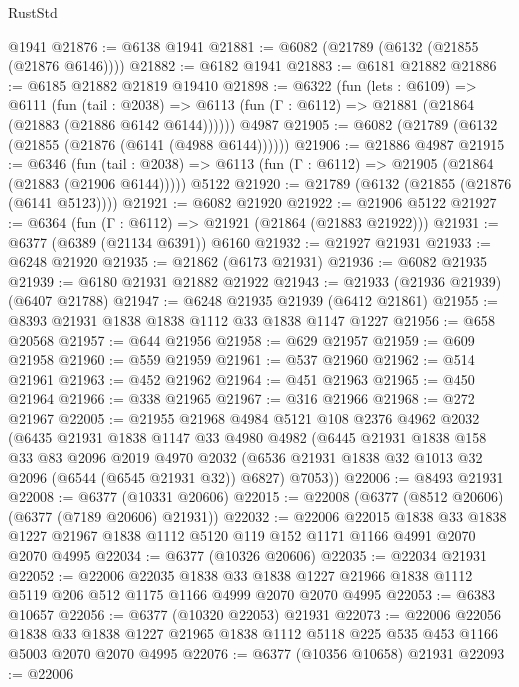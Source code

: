 \begin{lexlean}{RustStd}
\begin{coremodule}
    @1941
@21876 := @6138 @1941
@21881 := @6082 (@21789 (@6132 (@21855 (@21876 @6146))))
@21882 := @6182 @1941
@21883 := @6181 @21882
@21886 := @6185 @21882 @21819 @19410
@21898 := @6322
    (fun (lets : @6109) =>
    @6111
      (fun (tail : @2038) =>
      @6113 (fun (Γ : @6112) => @21881 (@21864 (@21883 (@21886 @6142 @6144))))))
    @4987
@21905 := @6082 (@21789 (@6132 (@21855 (@21876 (@6141 (@4988 @6144))))))
@21906 := @21886 @4987
@21915 := @6346
    (fun (tail : @2038) => @6113 (fun (Γ : @6112) => @21905 (@21864 (@21883 (@21906 @6144)))))
    @5122
@21920 := @21789 (@6132 (@21855 (@21876 (@6141 @5123))))
@21921 := @6082 @21920
@21922 := @21906 @5122
@21927 := @6364 (fun (Γ : @6112) => @21921 (@21864 (@21883 @21922)))
@21931 := @6377 (@6389 (@21134 @6391)) @6160
@21932 := @21927 @21931
@21933 := @6248 @21920
@21935 := @21862 (@6173 @21931)
@21936 := @6082 @21935
@21939 := @6180 @21931 @21882 @21922
@21943 := @21933 (@21936 @21939) (@6407 @21788)
@21947 := @6248 @21935 @21939 (@6412 @21861)
@21955 := @8393 @21931 @1838 @1838 @1112 @33 @1838 @1147 @1227
@21956 := @658 @20568
@21957 := @644 @21956
@21958 := @629 @21957
@21959 := @609 @21958
@21960 := @559 @21959
@21961 := @537 @21960
@21962 := @514 @21961
@21963 := @452 @21962
@21964 := @451 @21963
@21965 := @450 @21964
@21966 := @338 @21965
@21967 := @316 @21966
@21968 := @272 @21967
@22005 := @21955
    @21968
    @4984
    @5121
    @108
    @2376
    @4962
    @2032
    (@6435
      @21931
      @1838
      @1147
      @33
      @4980
      @4982
      (@6445
        @21931
        @1838
        @158
        @33
        @83
        @2096
        @2019
        @4970
        @2032
        (@6536 @21931 @1838 @32 @1013 @32 @2096 (@6544 (@6545 @21931 @32)) @6827)
        @7053))
@22006 := @8493 @21931
@22008 := @6377 (@10331 @20606)
@22015 := @22008 (@6377 (@8512 @20606) (@6377 (@7189 @20606) @21931))
@22032 := @22006
    @22015
    @1838
    @33
    @1838
    @1227
    @21967
    @1838
    @1112
    @5120
    @119
    @152
    @1171
    @1166
    @4991
    @2070
    @2070
    @4995
@22034 := @6377 (@10326 @20606)
@22035 := @22034 @21931
@22052 := @22006
    @22035
    @1838
    @33
    @1838
    @1227
    @21966
    @1838
    @1112
    @5119
    @206
    @512
    @1175
    @1166
    @4999
    @2070
    @2070
    @4995
@22053 := @6383 @10657
@22056 := @6377 (@10320 @22053) @21931
@22073 := @22006
    @22056
    @1838
    @33
    @1838
    @1227
    @21965
    @1838
    @1112
    @5118
    @225
    @535
    @453
    @1166
    @5003
    @2070
    @2070
    @4995
@22076 := @6377 (@10356 @10658) @21931
@22093 := @22006

\end{coremodule}
\end{lexlean}
